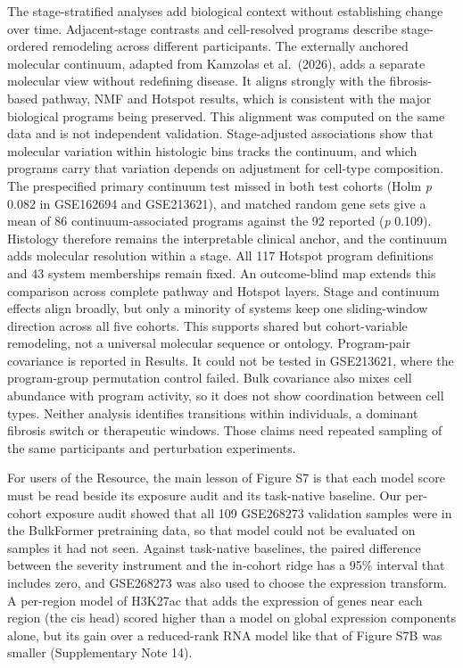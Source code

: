 The stage-stratified analyses add biological context without establishing
change over time. Adjacent-stage contrasts and cell-resolved programs describe
stage-ordered remodeling across different participants. The externally anchored
molecular continuum, adapted from Kamzolas et al.~(2026), adds a separate
molecular view without redefining disease. It aligns strongly with the
fibrosis-based pathway, NMF and Hotspot results, which is consistent with the
major biological programs being preserved. This alignment was computed on the
same data and is not independent validation. Stage-adjusted associations show
that molecular variation within histologic bins tracks the continuum, and which
programs carry that variation depends on adjustment for cell-type composition.
The prespecified primary continuum test missed in both test cohorts (Holm \emph{p}
0.082 in GSE162694 and GSE213621), and matched random gene sets give a mean of
86 continuum-associated programs against the 92 reported (\emph{p} 0.109).
Histology therefore remains the interpretable clinical anchor, and the continuum
adds molecular resolution within a stage. All 117 Hotspot program definitions
and 43 system memberships remain fixed. An outcome-blind map extends this
comparison across complete pathway and Hotspot layers. Stage and continuum
effects align broadly, but only a minority of systems keep one sliding-window
direction across all five cohorts. This supports shared but cohort-variable
remodeling, not a universal molecular sequence or ontology. Program-pair
covariance is reported in Results. It could not be tested in GSE213621, where
the program-group permutation control failed. Bulk covariance also mixes cell
abundance with program activity, so it does not show coordination between cell
types. Neither analysis identifies transitions within individuals, a dominant
fibrosis switch or therapeutic windows. Those claims need repeated sampling of
the same participants and perturbation experiments.

For users of the Resource, the main lesson of Figure S7 is that each model score
must be read beside its exposure audit and its task-native baseline.
Our per-cohort exposure audit showed that all 109 GSE268273
validation samples were in the BulkFormer pretraining data, so that model could not
be evaluated on samples it had not seen. Against task-native baselines, the paired
difference between the severity instrument and the in-cohort ridge has a 95\%
interval that includes zero, and GSE268273 was also used to choose the
expression transform. A per-region model of H3K27ac that adds the expression of genes near each
region (the cis head) scored higher than a model on global expression components
alone, but its gain over a reduced-rank RNA model like that of Figure S7B was
smaller (Supplementary Note 14).

